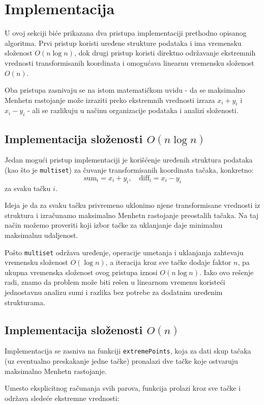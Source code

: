 \documentclass{article}
\begin{document}
\section{Implementacija}
U ovoj sekciji biće prikazana dva pristupa implementaciji prethodno opisanog algoritma. Prvi pristup koristi uređene strukture podataka i ima vremensku složenost $O(n \log n)$, dok drugi pristup koristi direktno održavanje ekstremnih vrednosti transformisanih koordinata i omogućava linearnu vremensku složenost $O(n)$.

Oba pristupa zasnivaju se na istom matematičkom uvidu - da se maksimalno Menhetn rastojanje može izraziti preko ekstremnih vrednosti izraza $x_i + y_i$ i $x_i - y_i$ - ali se razlikuju u načinu organizacije podataka i analizi složenosti.

\subsection{Implementacija složenosti $O(n \log n)$}
Jedan mogući pristup implementaciji je korišćenje uređenih struktura podataka (kao što je \texttt{multiset}) za čuvanje transformisanih koordinata tačaka, konkretno:
\[
\text{sum}_i = x_i + y_i, \quad \text{diff}_i = x_i - y_i
\]
za svaku tačku $i$. 

Ideja je da za svaku tačku privremeno uklonimo njene transformisane vrednosti iz struktura i izračunamo maksimalno Menhetn rastojanje preostalih tačaka. Na taj način možemo proveriti koji izbor tačke za uklanjanje daje minimalnu maksimalnu udaljenost.

Pošto \texttt{multiset} održava uređenje, operacije umetanja i uklanjanja zahtevaju vremensku složenost $O(\log n)$, a iteracija kroz sve tačke dodaje faktor $n$, pa ukupna vremenska složenost ovog pristupa iznosi $O(n \log n)$. Iako ovo rešenje radi, znamo da problem može biti rešen u linearnom vremenu koristeći jednostavnu analizu sumi i razlika bez potrebe za dodatnim uređenim strukturama.

\subsection{Implementacija složenosti $O(n)$}
Implementacija se zasniva na funkciji \texttt{extremePoints},  koja za dati skup tačaka (uz eventualno preskakanje jedne tačke)  pronalazi dve tačke koje ostvaruju maksimalno Menhetn rastojanje.

Umesto eksplicitnog računanja svih parova, funkcija prolazi kroz sve tačke i održava sledeće ekstremne vrednosti:
\end{document}
